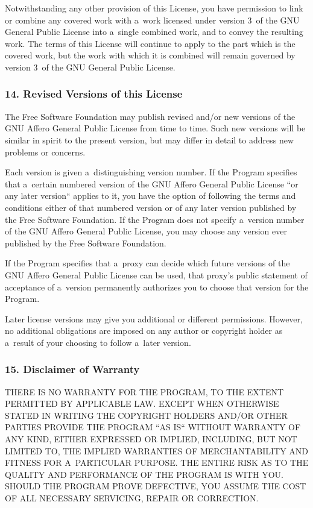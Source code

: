 \documentclass[a4paper, 11pt, twoside]{article}
\begin{document}
Notwithstanding any other provision of this License, you have permission to link or combine any covered work with a~work licensed under version 3~of the GNU General Public License into a~single combined work, and to convey the resulting work. The terms of this License will continue to apply to the part which is the covered work, but the work with which it is combined will remain governed by version 3~of the GNU General Public License.

\subsubsection{14. Revised Versions of this License}

The Free Software Foundation may publish revised and/or new versions of the GNU Affero General Public License from time to time. Such new versions will be similar in spirit to the present version, but may differ in detail to address new problems or concerns.

Each version is given a~distinguishing version number. If the Program specifies that a~certain numbered version of the GNU Affero General Public License “or any later version“ applies to it, you have the option of following the terms and conditions either of that numbered version or of any later version published by the Free Software Foundation. If the Program does not specify a~version number of the GNU Affero General Public License, you may choose any version ever published by the Free Software Foundation.

If the Program specifies that a~proxy can decide which future versions of the GNU Affero General Public License can be used, that proxy's public statement of acceptance of a~version permanently authorizes you to choose that version for the Program.

Later license versions may give you additional or different permissions. However, no additional obligations are imposed on any author or copyright holder as a~result of your choosing to follow a~later version.

\subsubsection{15. Disclaimer of Warranty}

THERE IS NO WARRANTY FOR THE PROGRAM, TO THE EXTENT PERMITTED BY APPLICABLE LAW. EXCEPT WHEN OTHERWISE STATED IN WRITING THE COPYRIGHT HOLDERS AND/OR OTHER PARTIES PROVIDE THE PROGRAM “AS IS“ WITHOUT WARRANTY OF ANY KIND, EITHER EXPRESSED OR IMPLIED, INCLUDING, BUT NOT LIMITED TO, THE IMPLIED WARRANTIES OF MERCHANTABILITY AND FITNESS FOR A~PARTICULAR PURPOSE. THE ENTIRE RISK AS TO THE QUALITY AND PERFORMANCE OF THE PROGRAM IS WITH YOU. SHOULD THE PROGRAM PROVE DEFECTIVE, YOU ASSUME THE COST OF ALL NECESSARY SERVICING, REPAIR OR CORRECTION.
\end{document}
